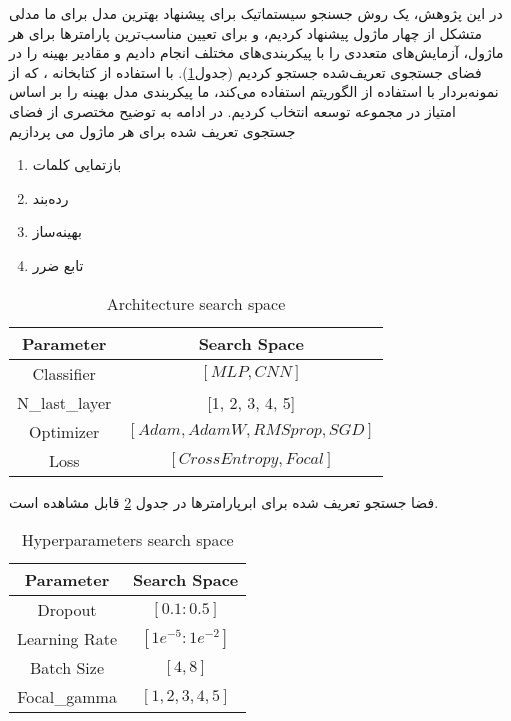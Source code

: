 در این پژوهش، یک روش جسنجو سیستماتیک برای پیشنهاد بهترین مدل برای 
ما مدلی متشکل از چهار ماژول پیشنهاد کردیم، و برای تعیین مناسب‌ترین پارامترها برای هر ماژول، آزمایش‌های متعددی را با پیکربندی‌های مختلف انجام دادیم و مقادیر بهینه را در فضای جستجوی تعریف‌شده جستجو کردیم (جدول\ref{Architecture-search-space}). با استفاده از کتابخانه
، که از نمونه‌بردار با استفاده از الگوریتم 
استفاده می‌کند، ما پیکربندی مدل بهینه را بر اساس امتیاز
در مجموعه توسعه انتخاب کردیم. در ادامه به توضیح مختصری از فضای جستجوی تعریف شده برای هر ماژول می پردازیم
\begin{enumerate}
	\item بازتمایی کلمات
	\item رده‌بند
	\item بهینه‌ساز
	\item تابع ضرر
\end{enumerate}

\begin{table}[h!]
	\centering
	\begin{tabular}{c  |c }
		\hline
		Parameter & Search Space\\
		\hline
		Classifier & $[MLP, CNN]$\\
		N\_last\_layer & [1, 2, 3, 4, 5]\\
		Optimizer & $[Adam, AdamW, RMSprop, SGD]$\\
		Loss & $[Cross Entropy, Focal]$\\
		
		
		\hline
		\hline
	\end{tabular}
	
	\centering
	\caption{\label{Architecture-search-space}Architecture search space}
\end{table}

فضا جستجو تعریف شده برای ابرپارامترها در جدول \ref{hyperparam-search-space} قابل مشاهده است.

\begin{table}[h!]
	\centering
	\begin{tabular}{c  |c }
		\hline
		Parameter & Search Space\\
		\hline
		Dropout  &  $[0.1 :  0.5]$\\
		Learning Rate & $[1e^{-5} :  1e^{-2}]$\\
		Batch Size & $[4, 8]$\\
		Focal\_gamma & $[1, 2, 3, 4, 5]$\\
		\hline
		\hline
	\end{tabular}
    \centering
\caption{\label{hyperparam-search-space}Hyperparameters search space}
\end{table}
